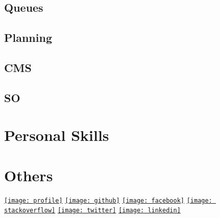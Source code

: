 \documentclass[11pt,a4paper,sans]{moderncv} %
\begin{document}
\subsection{Queues}

\subsection{Planning}

\subsection{CMS}

\subsection{SO}

\clearpage

\section{Personal Skills}
\renewcommand{\listitemsymbol}{-~}


\section{Others}
\centerline{
\href{https://lucax88x.github.io}{\texttt{[image: profile]}}
\quad
\href{https://github.com/lucax88x}{\texttt{[image: github]}}
\quad
\href{https://facebook.com/luca.trazzi}{\texttt{[image: facebook]}}
\quad
\href{http://stackoverflow.com/users/127041/luca-trazzi}{\texttt{[image: stackoverflow]}}
\quad
\href{https://twitter.com/LucaTrazzi}{\texttt{[image: twitter]}}
\quad
\href{https://www.linkedin.com/in/luca-trazzi-93217931}{\texttt{[image: linkedin]}}
}
\end{document}
